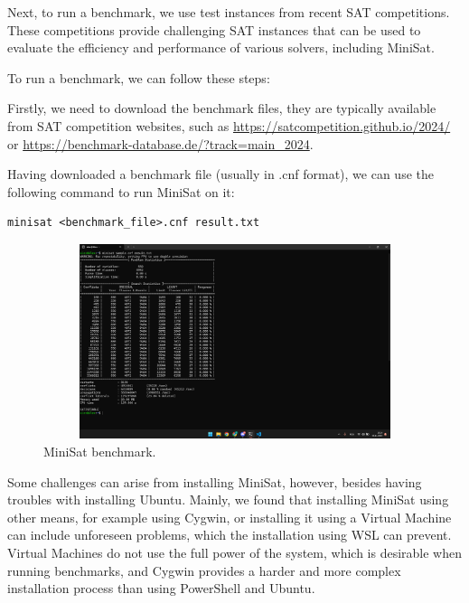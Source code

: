 \documentclass[runningheads]{llncs}
\begin{document}
Next, to run a benchmark, we use test instances from recent SAT competitions. These competitions provide challenging SAT instances that can be used to evaluate the efficiency and performance of various solvers, including MiniSat.

To run a benchmark, we can follow these steps:

Firstly, we need to download the benchmark files, they are typically available from SAT competition websites, such as \url{https://satcompetition.github.io/2024/} or \url{https://benchmark-database.de/?track=main_2024}.

Having downloaded a benchmark file (usually in .cnf format), we can use the following command to run MiniSat on it: \begin{verbatim}
minisat <benchmark_file>.cnf result.txt
\end{verbatim}

\begin{figure}
\centering
\includegraphics[width=12cm, height=5.7cm]{fig2.png}
\caption{MiniSat benchmark.} 
\label{fig2}
\end{figure}

Some challenges can arise from installing MiniSat, however, besides having troubles with installing Ubuntu. Mainly, we found that installing MiniSat using other means, for example using Cygwin, or installing it using a Virtual Machine can include unforeseen problems, which the installation using \ac{WSL} can prevent. Virtual Machines do not use the full power of the system, which is desirable when running benchmarks, and Cygwin provides a harder and more complex installation process than using PowerShell and Ubuntu.

\newpage

\begin{credits}
\subsubsection{\ackname} 

\subsubsection{\discintname}

\end{credits}
%
%
%
% 
% 
%
\newpage
{\noindent \huge \listoffigures \par}
\end{document}
